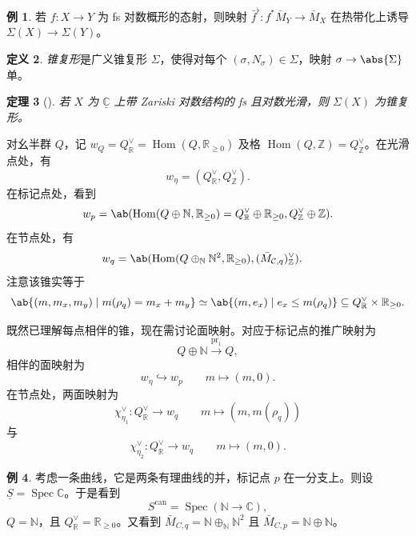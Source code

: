 \documentclass{amsart}
\newtheorem{thm}{定理}[section]
\theoremstyle{definition}
\newtheorem{defn}[thm]{定义}
\newtheorem{exm}[thm]{例}
\theoremstyle{remark}
\theoremstyle{plain}
\theoremstyle{definition}
\theoremstyle{remark}
\newcommand{\N}{\mathbb{N}}
\newcommand{\R}{\mathbb{R}}
\newcommand{\C}{\mathbb{C}}
\newcommand{\Z}{\mathbb{Z}}
\newcommand{\mc}[1]{\mathcal{#1}}
\newcommand{\on}[1]{\operatorname{#1}}
\newcommand{\ul}[1]{\underline{#1}}
\newcommand{\1}{\mathbf{1}}
\newcommand{\2}{\mathbf{2}}
\newcommand{\3}{\mathbf{3}}
\DeclareMathOperator{\Hom}{Hom}
\DeclareMathOperator{\Spec}{Spec}
\begin{document}
\begin{exm}
    若 \(f \colon X \to Y\) 为 fs 对数概形的态射，则映射 \(\bar{f}^{\flat} \colon f^* \bar{M}_Y \to \bar{M}_X\) 在热带化上诱导 \(\Sigma(X) \to \Sigma(Y)\)。
\end{exm}

\begin{defn}
    \textit{锥复形}是广义锥复形 \(\Sigma\)，使得对每个 \((\sigma, N_{\sigma}) \in \Sigma\)，映射 \(\sigma \to \abs{\Sigma}\) 单。
\end{defn}

\begin{thm}[{\cite{ACP2015}}]
    若 \(X\) 为 \(\ul{\C}\) 上带 Zariski 对数结构的 fs 且对数光滑，则 \(\Sigma(X)\) 为锥复形。
\end{thm}

对幺半群 \(Q\)，记 \(w_Q = Q_{\R}^{\vee} = \Hom(Q, \R_{\geq 0})\) 及格 \(\Hom(Q, \Z) = Q_{\Z}^{\vee}\)。在光滑点处，有
\[ w_{\eta} = (Q_{\R}^{\vee}, Q_{\Z}^{\vee}). \]
在标记点处，看到
\[ w_p = \ab(\Hom (Q \oplus \N, \R_{\geq 0}) = Q_{\R}^{\vee} \oplus \R_{\geq 0}, Q_{\Z}^{\vee}\oplus \Z). \]
在节点处，有
\begin{align*}
    w_q &= \ab(\Hom(Q \oplus_{\N} \N^2, \R_{\geq 0}), ( \bar{M}_{\mc{C}, q} )_{\Z}^{\vee}).
\end{align*}
注意该锥实等于
\[ \ab\{(m, m_x, m_y) \mid m(\rho_q) = m_x + m_y \} \simeq \ab\{(m, e_x) \mid e_x \leq m(\rho_q) \} \subseteq Q_{\R}^{\vee} \times \R_{\geq 0}. \]

既然已理解每点相伴的锥，现在需讨论面映射。对应于标记点的推广映射为
\[ Q \oplus \N \xrightarrow{\on{pr}_1} Q, \]
相伴的面映射为
\[ w_{\eta} \hookrightarrow w_p \qquad m \mapsto (m,0). \]
在节点处，两面映射为
\[ \chi_{\eta_1}^{\vee} \colon Q_{\R}^{\vee} \to w_q \qquad m \mapsto (m, m(\rho_q)) \]
与
\[ \chi_{\eta_2}^{\vee} \colon Q_{\R}^{\vee} \to w_q \qquad m \mapsto (m, 0). \]

\begin{exm}
    考虑一条曲线，它是两条有理曲线的并，标记点 \(p\) 在一分支上。则设 \(\ul{S} = \Spec \C\)。于是看到
    \[ S^{\on{can}} = \Spec(\N \to \C), \]
    \(Q = \N\)，且 \(Q_{\R}^{\vee} = \R_{\geq 0}\)。又看到 \(\bar{M}_{C, q} = \N \oplus_{\N} \N^2\) 且 \(\bar{M}_{C, p} = \N \oplus \N\)。
\end{exm}
\end{document}
